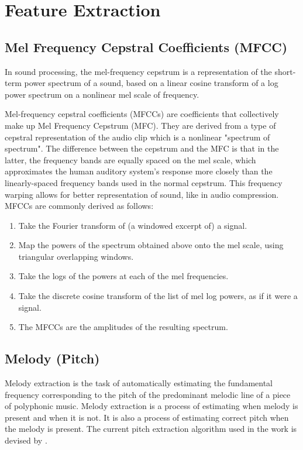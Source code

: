 \section{Feature Extraction}
\subsection{Mel Frequency Cepstral Coefficients (MFCC)}
In sound processing, the mel-frequency cepstrum is a representation of the short-term power spectrum of a sound, based on a linear cosine transform of a log power spectrum on a nonlinear mel scale of frequency.\par
Mel-frequency cepstral coefficients (MFCCs) are coefficients that collectively make up Mel Frequency Cepstrum (MFC). They are derived from a type of cepstral representation of the audio clip which is a nonlinear "spectrum of spectrum". The difference between the cepstrum and the MFC is that in the latter, the frequency bands are equally spaced on the mel scale, which approximates the human auditory system's response more closely than the linearly-spaced frequency bands used in the normal cepstrum. This frequency warping allows for better representation of sound, like in audio compression. MFCCs are commonly derived as follows:
\begin{enumerate} 
\item Take the Fourier transform of (a windowed excerpt of) a signal.
\item Map the powers of the spectrum obtained above onto the mel scale, using triangular overlapping windows.
\item Take the logs of the powers at each of the mel frequencies.
\item Take the discrete cosine transform of the list of mel log powers, as if it were a signal.
\item The MFCCs are the amplitudes of the resulting spectrum.
\end{enumerate}

\subsection{Melody (Pitch)}
Melody extraction is the task of automatically estimating the fundamental frequency corresponding to the pitch of the predominant melodic line of a piece of polyphonic music. Melody extraction is a process of estimating when melody is present and when it is not. It is also a process of estimating correct pitch when the melody is present. The current pitch extraction algorithm used in the work is devised by \cite{justin}.


